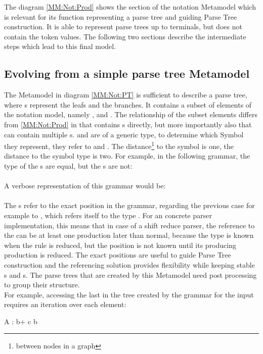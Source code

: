 The diagram \ref{MM:Not:Prod} shows the section of the notation Metamodel which is relevant for its function representing a parse tree and guiding Parse Tree construction. It is able to represent parse trees up to terminals, but does not contain the token values. The following two sections describe the intermediate steps which lead to this final model.\\


\subsection{Evolving from a simple parse tree Metamodel} The Metamodel in diagram \ref{MM:Not:PT} is sufficient to describe a parse tree, where s represent the leafs and  the branches. It contains a subset of elements of the notation model, namely ,  and . The relationship of the subset elements differs from \ref{MM:Not:Prod} in that  contains s directly, but more importantly also that  can contain multiple s.  and  are of a generic type, to determine which Symbol they represent, they refer to  and . The distance\footnote{\raggedright between nodes in a graph} to the symbol is one, the distance to the symbol type is two. 
For example, in the following grammar, the type of the s are equal, but the s are not:\\
 \\
A verbose representation of this grammar would be: \\
 \\
The s refer to the exact position in the grammar, regarding the previous case for example to , which refers itself to the type . For an concrete parser implementation, this means that in case of a shift reduce parser, the reference to the  can be at least one production later than normal, because the type is known when the rule is reduced, but the position is not known until its producing production is reduced. The exact positions are useful to guide Parse Tree construction and the referencing solution provides flexibility while keeping stable s and s. The parse trees that are created by this Metamodel need post processing to group their structure. \\
For example, accessing the last  in the tree created by the grammar for the input  requires an iteration over each element:\\
\begin{xtxt}
A : b+ c b 
\end{xtxt}


